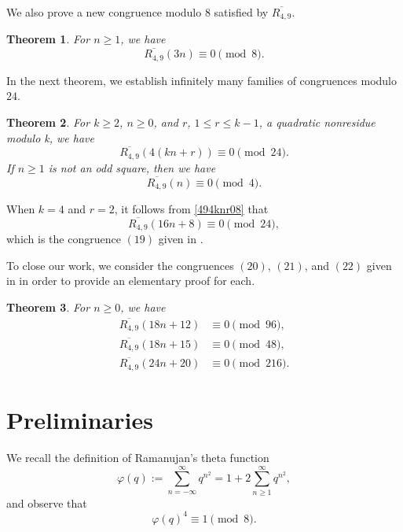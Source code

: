 \documentclass{amsart}
\newtheorem{theorem}{Theorem}[section]
\theoremstyle{definition}
\begin{document}
We also prove a new congruence modulo 8 satisfied by $\overline{R_{4,9}}$.
\begin{theorem}\label{T493n08} For $n\geq1$, we have
   \begin{equation*} \label{493n08}\overline{R_{4,9}}(3n)\equiv 0\pmod{8}.
   \end{equation*}
\end{theorem}
In the next theorem, we establish infinitely many families of congruences modulo $24$.
\begin{theorem}\label{T494knr}
For $k\geq2$, $n\geq0$, and $r$, $1\leq r\leq k-1$, a quadratic nonresidue modulo k, we have
\begin{equation}\label{494knr08}
\overline{R_{4,9}}\left(4(kn+r)\right)\equiv0\pmod{24}.
\end{equation}
If $n\geq1$ is not an odd square, then we have 
    \begin{equation}\label{49n04}
        \overline{R_{4,9}}(n)\equiv0\pmod{4}.
    \end{equation}
    \end{theorem}
When $k=4$ and $r=2$, it follows from \eqref{494knr08} that
\begin{equation*}
    \overline{R_{4,9}}(16n+8)\equiv0\pmod{24},
\end{equation*}
which is the congruence $(19)$ given in \cite[Theorem 4.1]{Alanazi-Munagi-Saikia}.

\bigskip 

To close our work, we consider the congruences $(20)$, $(21)$, and $(22)$ given in \cite[Theorem 4.1]{Alanazi-Munagi-Saikia} in order to provide an elementary proof for each. 
\begin{theorem}\label{T49} For $n\geq 0$, we have
    \begin{align}
     \label{4918n1296} \overline{R_{4,9}}(18n+12)&\equiv0\pmod{96},\\
     \label{4918n1548} \overline{R_{4,9}}(18n+15)&\equiv0\pmod{48},\\
     \label{4924n20216} \overline{R_{4,9}}(24n+20)&\equiv0\pmod{216}.
    \end{align}
\end{theorem}
\section{Preliminaries}
We recall the definition of Ramanujan's theta function
$$\varphi(q):=\sum_{n=-\infty}^\infty q^{n^2}=1+2\sum_{n\geq1}^\infty q^{n^2},$$
and observe that
\begin{equation}\label{phiq^418}
\varphi(q)^4\equiv1\pmod{8}.
\end{equation}
\end{document}
